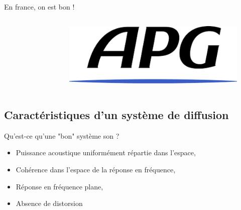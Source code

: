 \documentclass[aspectratio=169]{beamer}
\begin{document}
\begin{frame}{En france, on est bon !}
\begin{columns}[t]
\begin{column}{.33\textwidth}
\begin{figure}[!h]
	\end{figure}
  \end{column}
  \begin{column}{.33\textwidth}
	\vspace{1.5cm}
  	\begin{figure}[!h]
	\includegraphics[width=1\textwidth]{figure/Logo-APG.jpg}
	\end{figure}
  \end{column}
\end{columns}
\end{frame}

\subsection{Caractéristiques d'un système de diffusion}
\begin{frame}{Qu'est-ce qu'une "bon" système son ?}
\begin{itemize}
	\pause
	\item Puissance acoustique uniformément répartie dans l'espace,
	\pause
	\item Cohérence dans l'espace de la réponse en fréquence,
	\pause	
	\item Réponse en fréquence plane,
	\pause	
	\item Absence de distorsion 
\end{itemize}
\end{frame}
\end{document}
